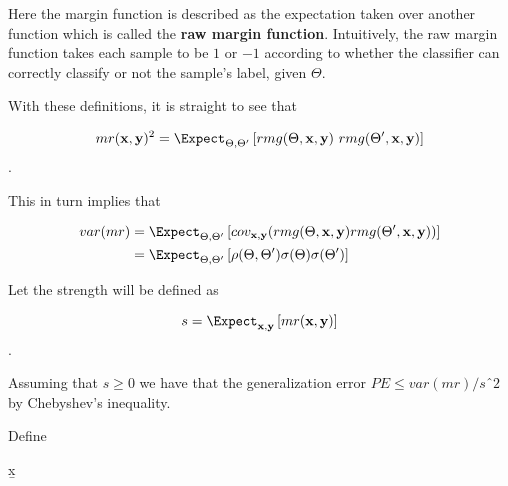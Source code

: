 Here the margin function is described as the expectation taken over another function which is called the \textbf{raw margin function}\label{eq:rf-rawMarginFun}. Intuitively, the raw margin function takes each sample to be $1$ or $-1$ according to whether the classifier can correctly classify or not the sample's label, given $\Theta$.

With these definitions, it is straight to see that 

$$mr( \textbf{x},\textbf{y} )^2 = \Expect_{\Theta, \Theta'} \left[ rmg( \Theta,\textbf{x},\textbf{y} ) \ rmg(\Theta',\textbf{x},\textbf{y} )  \right] $$.

This in turn implies that

\begin{equation}\label{eq:rf-marginFunVar}
\begin{split}
var(mr) & =  \Expect_{\Theta, \Theta'} 
			\left[ 
				cov_{\textbf{x},\textbf{y}}
				(rmg(\Theta,\textbf{x},\textbf{y} )rmg(\Theta',\textbf{x},\textbf{y} )) 
			\right] \\
& =  \Expect_{\Theta, \Theta'}
			\left[ 
				\rho(\Theta, \Theta')\sigma(\Theta)\sigma(\Theta')
			\right] 
\end{split}
\end{equation}

Let the strength will be defined as 

$$s =  \Expect_{\textbf{x},\textbf{y}} \left[ mr(\textbf{x},\textbf{y} ) \right] $$. \label{eq:rf-strength}

Assuming that $s \geq 0$ we have that the generalization error $PE \leq var(mr)/sˆ2$ by Chebyshev's inequality. 

Define 



\b{x}



